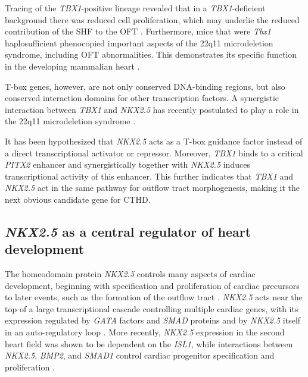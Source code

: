 \begin{refsection}
Tracing of the \textit{TBX1}-positive lineage revealed that in a \textit{TBX1}-deficient background there was reduced cell proliferation, which may underlie the reduced contribution of the SHF to the OFT \cite{naiche2005t,plageman2005t,stennard2005t}. Furthermore, mice that were \textit{Tbx1} haplosufficient phenocopied important aspects of the 22q11 microdeletion syndrome, including OFT abnormalities. This demonstrates its specific function in the developing mammalian heart \cite{merscher2001tbx1,jerome2001digeorge,liao2004full}.


T-box genes, however, are not only conserved DNA-binding regions, but also conserved interaction domains for other transcription factors. A synergistic interaction between \textit{TBX1} and \textit{NKX2.5} has recently postulated to play a role in the 22q11 microdeletion syndrome \cite{nowotschin2006tbx1}.

It has been hypothesized that \textit{NKX2.5} acts as a T-box guidance factor instead of a direct transcriptional activator or repressor. Moreover, \textit{TBX1} binds to a critical \textit{PITX2} enhancer and synergistically together with \textit{NKX2.5} induces transcriptional activity of this enhancer. This further indicates that \textit{TBX1} and \textit{NKX2.5} act in the same pathway for outflow tract morphogenesis, making it the next obvious candidate gene for CTHD.


\subsection{\textit{NKX2.5} as a central regulator of heart development}

The homeodomain protein \textit{NKX2.5} controls many aspects of cardiac development, beginning with specification and proliferation of cardiac precursors to later events, such as the formation of the outflow tract \cite{harvey2002patterning}. \textit{NKX2.5} acts near the top of a large transcriptional cascade controlling multiple cardiac genes, with its expression regulated by \textit{GATA} factors and \textit{SMAD} proteins and by \textit{NKX2.5} itself in an auto-regulatory loop \cite{liberatore2002nkx,lien2002cardiac,lien1999control,searcy1998gata}. More recently, \textit{NKX2.5} expression in the second heart field was shown to be dependent on the \textit{ISL1}, while interactions between \textit{NKX2.5}, \textit{BMP2}, and \textit{SMAD1} control cardiac progenitor specification and proliferation \cite{prall2007nkx2,takeuchi2005tbx20}.


\end{refsection}
